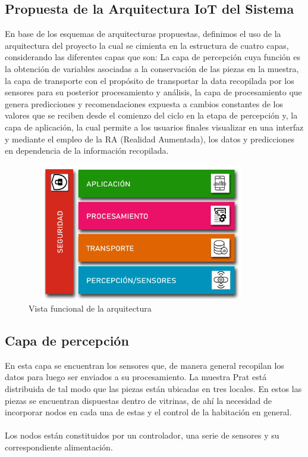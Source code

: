     \subsection{Propuesta de la Arquitectura IoT del Sistema}

    En base de los esquemas de arquitecturas propuestas, definimos el uso de la arquitectura del proyecto la cual se cimienta en la estructura de cuatro capas, considerando las diferentes capas que son: La capa de percepción cuya función es la obtención de variables asociadas a la conservación de las piezas en la muestra, la capa de transporte con el propósito de transportar la data recopilada por los sensores para su posterior procesamiento y análisis, la capa de procesamiento que genera predicciones y recomendaciones expuesta a cambios constantes de los valores que se reciben desde el comienzo del ciclo en la etapa de percepción y, la capa de aplicación, la cual permite a los usuarios finales visualizar en una interfaz y mediante el empleo de la RA (Realidad Aumentada), los datos y predicciones en dependencia de la información recopilada.\\

    \begin{figure}[h]
        \centering
        \includegraphics[width=10cm, height=6cm]{imagenes/myArquitecture0.jpg}
        \caption{Vista funcional de la arquitectura}
        \label{imag:arquitecturaPropuesta}
    \end{figure}

    \subsection{Capa de percepción}
    En esta capa se encuentran los sensores que, de manera general recopilan los datos para luego ser enviados a su procesamiento. La muestra Prat está distribuida de tal modo que las piezas están ubicadas en tres locales. En estos las piezas se encuentran dispuestas dentro de vitrinas, de ahí la necesidad de incorporar nodos en cada una de estas y el control de la habitación en general.\\\\
    Los nodos están constituidos por un controlador, una serie de sensores y su correspondiente alimentación.\\
        
